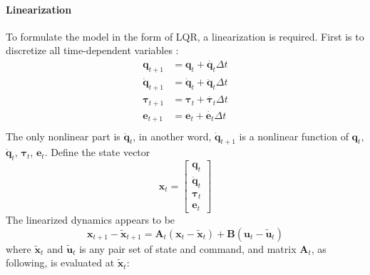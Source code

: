 \paragraph{Linearization}
To formulate the model in the form of LQR, a linearization is required. First is to discretize all time-dependent variables :
\begin{equation}
\begin{split}
\bm{q}_{t+1} &= \bm{q}_{t} + \dot{\bm{q}_{t}} \Delta t \\
\dot{\bm{q}}_{t+1} &= \dot{\bm{q}}_{t} + \ddot{\bm{q}}_{t} \Delta t \\
\bm{\tau}_{t+1} &= \bm{\tau}_{t} + \dot{\bm{\tau}_{t}} \Delta t \\
\bm{e}_{t+1} &= \bm{e}_{t} + \dot{\bm{e}_{t}} \Delta t \\
\end{split}
\end{equation}
The only nonlinear part is $\ddot{\bm{q}}_t$, in another word, $\dot{\bm{q}}_{t+1}$ is a nonlinear function of $\bm{q}_t$, $\dot{\bm{q}}_t$, ${\bm{\tau}}_t$, ${\bm{e}}_t$. Define the state vector 
\begin{equation}
\bm{x}_t=\left[ \begin{matrix}\bm{q}_t \\ \dot{\bm{q}}_t \\ \bm{\tau}_t \\ \bm{e}_t \end{matrix} \right]
\end{equation}
The linearized dynamics appears to be
\begin{equation}
\bm{x}_{t+1} - \tilde{\bm{x}}_{t+1} = \bm{A}_t (\bm{x}_t - \tilde{\bm{x}}_{t}) + \bm{B}(\bm{u}_t - \tilde{\bm{u}}_t)
\end{equation}
where $\tilde{\bm{x}}_t$ and $\tilde{\bm{u}}_t$ is any pair set of state and command, and matrix $\bm{A}_t$, as following, is evaluated at $\tilde{\bm{x}}_t$:
